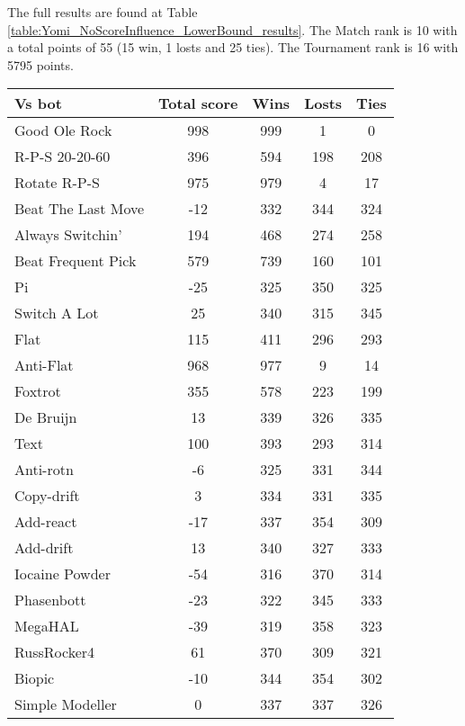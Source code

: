The full results are found at Table \ref{table:Yomi_NoScoreInfluence_LowerBound_results}. The Match rank is 10 with a total points of 55 (15 win, 1 losts and 25 ties). The Tournament rank is 16 with 5795 points.

\begin{table*}
    \caption{Yomi_NoScoreInfluence_LowerBound results}
    \label{table:Yomi_NoScoreInfluence_LowerBound_results}
    \centering
    \begin{tabular}{|l|c|c|c|c|}
        \hline
        \textbf{Vs bot} & \textbf{Total score} & \textbf{Wins} & \textbf{Losts} & \textbf{Ties} \\ \hline
Good Ole Rock & 998 & 999 & 1 & 0 \\ \hline 
R-P-S 20-20-60 & 396 & 594 & 198 & 208 \\ \hline 
Rotate R-P-S & 975 & 979 & 4 & 17 \\ \hline 
Beat The Last Move & -12 & 332 & 344 & 324 \\ \hline 
Always Switchin' & 194 & 468 & 274 & 258 \\ \hline 
Beat Frequent Pick & 579 & 739 & 160 & 101 \\ \hline 
Pi & -25 & 325 & 350 & 325 \\ \hline 
Switch A Lot & 25 & 340 & 315 & 345 \\ \hline 
Flat & 115 & 411 & 296 & 293 \\ \hline 
Anti-Flat & 968 & 977 & 9 & 14 \\ \hline 
Foxtrot & 355 & 578 & 223 & 199 \\ \hline 
De Bruijn & 13 & 339 & 326 & 335 \\ \hline 
Text & 100 & 393 & 293 & 314 \\ \hline 
Anti-rotn & -6 & 325 & 331 & 344 \\ \hline 
Copy-drift & 3 & 334 & 331 & 335 \\ \hline 
Add-react & -17 & 337 & 354 & 309 \\ \hline 
Add-drift & 13 & 340 & 327 & 333 \\ \hline 
Iocaine Powder & -54 & 316 & 370 & 314 \\ \hline 
Phasenbott & -23 & 322 & 345 & 333 \\ \hline 
MegaHAL & -39 & 319 & 358 & 323 \\ \hline 
RussRocker4 & 61 & 370 & 309 & 321 \\ \hline 
Biopic & -10 & 344 & 354 & 302 \\ \hline 
Simple Modeller & 0 & 337 & 337 & 326 \\ \hline 

\end{tabular}
\end{table*}
